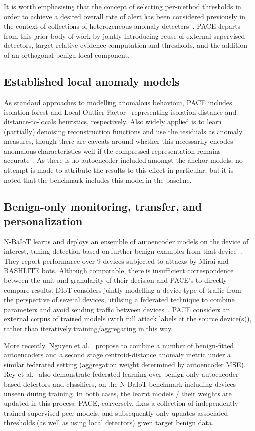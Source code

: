 It is worth emphasising that the concept of selecting per-method thresholds in order to achieve a desired overall rate of alert has been considered previously in the context of collections of heterogeneous anomaly detectors~\cite{bridges2017threshold}. PACE departs from this prior body of work by jointly introducing reuse of external supervised detectors, target-relative evidence computation and thresholds, and the addition of an orthogonal benign-local component.

\subsection{Established local anomaly models} 
As standard approaches to modelling anomalous behaviour, PACE includes isolation forest and Local Outlier Factor~\cite{liu2008isolation,breunig2000lof} representing isolation-distance and distance-to-locals heuristics, respectively. Also widely applied is to learn (partially) denoising reconstruction functions and use the residuals as anomaly measures, though there are caveats around whether this necessarily encodes anomalous characteristics well if the compressed representation remains accurate~\cite{pang2021review}. As there is no autoencoder included amongst the anchor models, no attempt is made to attribute the results to this effect in particular, but it is noted that the benchmark includes this model in the baseline.

\subsection{Benign-only monitoring, transfer, and personalization} 
N-BaIoT learns and deploys an ensemble of autoencoder models on the device of interest, tuning detection based on further benign examples from that device~\cite{nbaiot2018}. They report performance over 9 devices subjected to attacks by Mirai and BASHLITE bots. Although comparable, there is insufficient correspondence between the unit and granularity of their decision and PACE's to directly compare results. D\"IoT considers jointly modelling a device type of traffic from the perspective of several devices, utilising a federated technique to combine parameters and avoid sending traffic between devices~\cite{diot2019}. PACE considers an external corpus of trained models (with full attack labels at the source device(s)), rather than iteratively training/aggregating in this way.

More recently, Nguyen et al.~\cite{nguyen2025fedmse} propose to combine a number of benign-fitted autoencoders and a second stage centroid-distance anomaly metric under a similar federated setting (aggregation weight determined by autoencoder MSE). Rey et al.~\cite{rey2022federated} also demonstrate federated learning over benign-only autoencoder-based detectors and classifiers, on the N-BaIoT benchmark including devices unseen during training. In both cases, the learnt models / their weights are updated in this process. PACE, conversely, fixes a collection of independently-trained supervised peer models, and subsequently only updates associated thresholds (as well as using local detectors) given target benign data.

